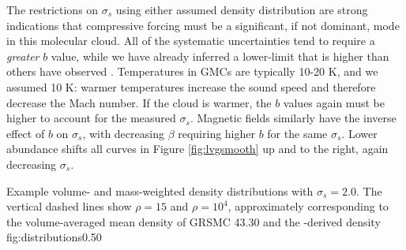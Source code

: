 The restrictions on $\sigma_s$ using either assumed density distribution are
strong indications that compressive forcing must be a significant, if not
dominant, mode in this molecular cloud.  
All of the systematic uncertainties tend to require a \emph{greater} $b$
value, while we have already inferred a lower-limit
that is higher than others have observed \citep{Brunt2010c,Kainulainen2013a}.
Temperatures in GMCs are typically 10-20 K, and we assumed 10 K: warmer
temperatures increase the sound speed and therefore decrease the Mach number. If
the cloud is warmer, the $b$ values again must be higher to account for the measured
$\sigma_s$.  Magnetic fields similarly have the inverse effect of $b$ on
$\sigma_s$, with decreasing $\beta$ requiring higher $b$ for the same
$\sigma_s$.
Lower abundance shifts all curves in Figure
\ref{fig:lvgsmooth} up and to the right, again decreasing $\sigma_s$.

{  Example volume- and mass-weighted density distributions with
$\sigma_s=2.0$.  The vertical dashed lines show $\rho = 15$ and $\rho=10^4$,
approximately corresponding to the volume-averaged mean density of GRSMC 43.30
and the \formaldehyde-derived density}
{fig:distributions}{0.5}{0}

% 

% 

